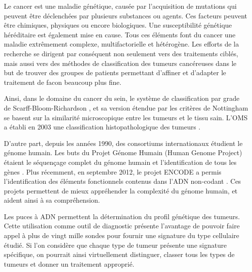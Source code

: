     Le cancer est une maladie génétique, causée par l'acquisition de mutations qui peuvent être déclenchées par plusieurs substances ou agents.
    Ces facteurs peuvent être chimiques, physiques ou encore biologiques.
    Une susceptibilité génétique héréditaire est également mise en cause.
    Tous ces éléments font du cancer une maladie extrêmement complexe, multifactorielle et hétérogène.
    Les efforts de la recherche se dirigent par conséquent non seulement vers des traitements ciblés, mais aussi vers des méthodes de classification des tumeurs cancéreuses dans le but de trouver des groupes de patients permettant d'affiner et d'adapter le traitement de facon beaucoup plus fine.
    \pagebreak

    Ainsi, dans le domaine du cancer du sein, le système de classification par grade de Scarff-Bloom-Richardson \citep{Bloom1957}, et sa version étendue par les critères de Nottingham \citep{Elston1991} se basent sur la similarité microscopique entre les tumeurs et le tissu sain.
    L'\ac{OMS} a établi en 2003 une classification histopathologique des tumeurs \citep{WHO2003}.

    D'autre part, depuis les années 1990, des consortiums internationaux étudient le génome humain.
    Les buts du Projet Génome Humain (Human Genome Project) étaient le séquençage complet du génome humain et l'identification de tous les gènes \citep{HGP2001}.
    Plus récemment, en septembre 2012, le projet \ac{ENCODE} a permis l'identification des éléments fonctionnels contenus dans l'\acs{ADN} non-codant \citep{ENCODE2012}.
    Ces projets permettent de mieux appréhender la complexité du génome humain, et aident ainsi à sa compréhension.

    Les puces à \acs{ADN} permettent la détermination du profil génétique des tumeurs.
    Cette utilisation comme outil de diagnostic présente l'avantage de pouvoir faire appel à plus de vingt mille sondes pour fournir une signature du type cellulaire étudié.
    Si l'on considère que chaque type de tumeur présente une signature spécifique, on pourrait ainsi virtuellement distinguer, classer tous les types de tumeurs et donner un traitement approprié.

